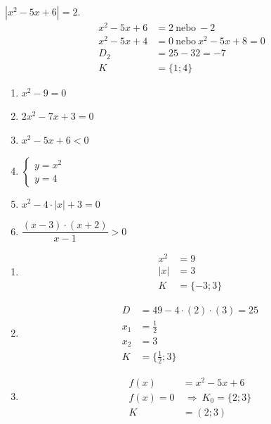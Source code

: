 \documentclass[11pt,a4paper]{article}
\begin{document}
\begin{zadaniReseniBox}[title={Rozšíření 1}]
$|x^2-5x+6|=2$.
\tcblower
\[\begin{aligned}
x^2-5x+6&=2\ \text{nebo}\ -2\\x^2-5x+4&=0\ \text{nebo}\ x^2-5x+8=0\\D_2&=25-32=-7\\K&=\{1;4\}
\end{aligned}\]
\end{zadaniReseniBox}
\begin{zadaniReseniBox}[title={Domácí úkol}]
\begin{enumerate}[label=\alph*),itemsep=2pt]
\item $x^{2} - 9=0$
\item $2x^{2} - 7x + 3=0$
\item $x^{2} - 5x + 6<0$
\item $\begin{cases}y=x^{2}\\y=4\end{cases}$
\item $x^{2} - 4 \cdot \left|{x}\right| + 3=0$
\item $\dfrac{\left(x - 3\right) \cdot \left(x + 2\right)}{x - 1}>0$
\end{enumerate}
\tcblower
\begin{enumerate}[label=\alph*),itemsep=2pt]
\item
\[\begin{aligned}
x^2&=9\\|x|&=3\\[2pt]
K&=\{-3;3\}
\end{aligned}\]
\item
\[\begin{aligned}
D&=49-4\cdot(2)\cdot(3)=25\\[2pt]
x_1&=\frac{1}{2}\\[2pt]
x_2&=3\\[2pt]
K&=\{\frac{1}{2};3\}
\end{aligned}\]
\item
\[\begin{aligned}
f(x)&=x^{2} - 5x + 6\\[2pt]
f(x)=0&\ \Rightarrow\ K_0=\{2;3\}\\[2pt]
K&=(2;3)
\end{aligned}\]

\end{enumerate}
\end{zadaniReseniBox}
\end{document}
